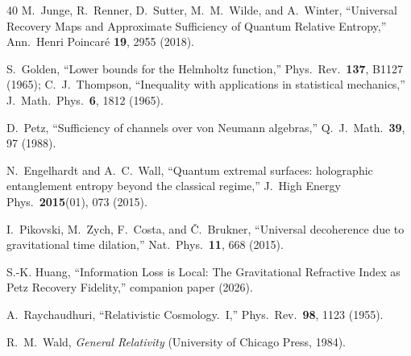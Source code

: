 \documentclass[aps,prd,preprint,superscriptaddress,longbibliography]{revtex4-2}
\begin{document}
\begin{thebibliography}{40}
M.~Junge, R.~Renner, D.~Sutter, M.~M.~Wilde, and A.~Winter,
``Universal Recovery Maps and Approximate Sufficiency of Quantum
Relative Entropy,''
Ann.\ Henri Poincar\'e \textbf{19}, 2955 (2018).

S.~Golden, ``Lower bounds for the Helmholtz function,''
Phys.\ Rev.\ \textbf{137}, B1127 (1965);
C.~J.~Thompson, ``Inequality with applications in statistical
mechanics,'' J.\ Math.\ Phys.\ \textbf{6}, 1812 (1965).

D.~Petz,
``Sufficiency of channels over von Neumann algebras,''
Q.\ J.\ Math.\ \textbf{39}, 97 (1988).

N.~Engelhardt and A.~C.~Wall,
``Quantum extremal surfaces: holographic entanglement entropy beyond
the classical regime,''
J.\ High Energy Phys.\ \textbf{2015}(01), 073 (2015).

I.~Pikovski, M.~Zych, F.~Costa, and \v{C}.~Brukner,
``Universal decoherence due to gravitational time dilation,''
Nat.\ Phys.\ \textbf{11}, 668 (2015).

S.-K. Huang,
``Information Loss is Local: The Gravitational Refractive Index as Petz
Recovery Fidelity,'' companion paper (2026).

A.~Raychaudhuri,
``Relativistic Cosmology.\ I,''
Phys.\ Rev.\ \textbf{98}, 1123 (1955).

R.~M.~Wald,
\emph{General Relativity} (University of Chicago Press, 1984).

\end{thebibliography}
\end{document}
